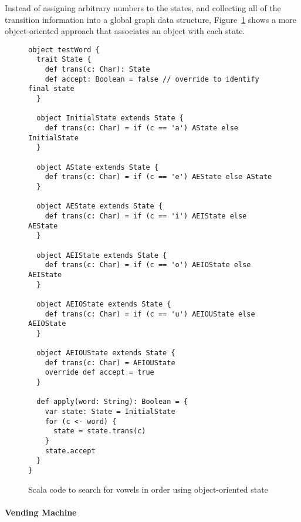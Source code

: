 Instead of assigning arbitrary numbers to the states, and collecting all of the
transition information into a global graph data structure, Figure~\ref{fig:vowelsobjects} shows a more object-oriented
approach that associates an object with each state.
\begin{figure}
\begin{verbatim}
object testWord {
  trait State {
    def trans(c: Char): State
    def accept: Boolean = false // override to identify final state
  }

  object InitialState extends State {
    def trans(c: Char) = if (c == 'a') AState else InitialState
  }

  object AState extends State {
    def trans(c: Char) = if (c == 'e') AEState else AState
  }

  object AEState extends State {
    def trans(c: Char) = if (c == 'i') AEIState else AEState
  }

  object AEIState extends State {
    def trans(c: Char) = if (c == 'o') AEIOState else AEIState
  }

  object AEIOState extends State {
    def trans(c: Char) = if (c == 'u') AEIOUState else AEIOState
  }

  object AEIOUState extends State {
    def trans(c: Char) = AEIOUState
    override def accept = true
  }

  def apply(word: String): Boolean = {
    var state: State = InitialState
    for (c <- word) {
      state = state.trans(c)
    }
    state.accept
  }
}
\end{verbatim}
\caption{Scala code to search for vowels in order using object-oriented state}
\label{fig:vowelsobjects}
\end{figure}

\paragraph{Vending Machine}

